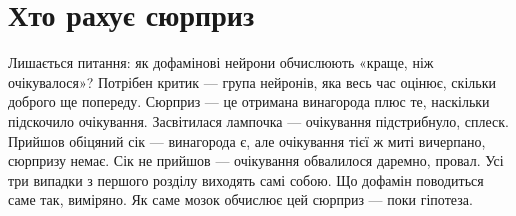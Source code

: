 \section*{Хто рахує сюрприз}

Лишається питання: як дофамінові нейрони обчислюють «краще, ніж очікувалося»? Потрібен критик --- група нейронів, яка весь час оцінює, скільки доброго ще попереду. Сюрприз --- це отримана винагорода плюс те, наскільки підскочило очікування. Засвітилася лампочка --- очікування підстрибнуло, сплеск. Прийшов обіцяний сік --- винагорода є, але очікування тієї ж миті вичерпано, сюрпризу немає. Сік не прийшов --- очікування обвалилося даремно, провал. Усі три випадки з першого розділу виходять самі собою. Що дофамін поводиться саме так, виміряно. Як саме мозок обчислює цей сюрприз --- поки гіпотеза.

